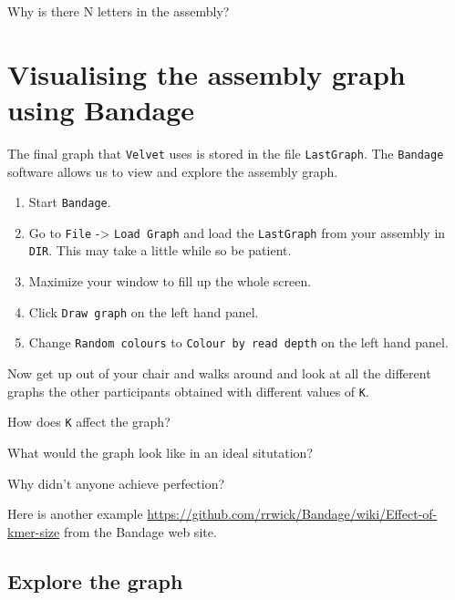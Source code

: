 \begin{questions}
Why is there N letters in the assembly?
\begin{answer}
\end{answer}
\end{questions}

\section{Visualising the assembly graph using Bandage}

The final graph that \texttt{Velvet} uses is stored in the file \texttt{LastGraph}. The \texttt{Bandage} software allows us to view and explore the assembly graph.
\begin{steps}
\begin{enumerate}
\item Start \texttt{Bandage}.
\item Go to \texttt{File} -> \texttt{Load Graph} and load the \texttt{LastGraph} from your assembly in \texttt{DIR}. This may take a little while so be patient.
\item Maximize your window to fill up the whole screen.
\item Click \texttt{Draw graph} on the left hand panel.
\item Change \texttt{Random colours} to \texttt{Colour by read depth} on the left hand panel.
\end{enumerate}
\end{steps}

Now get up out of your chair and walks around and look at all the different graphs the other participants obtained with different values of \texttt{K}.
\begin{questions}
How does \texttt{K} affect the graph?
\begin{answer}
\end{answer}
What would the graph look like in an ideal situtation?
\begin{answer}
\end{answer}
Why didn't anyone achieve perfection?
\begin{answer}
\end{answer}
\end{questions}

Here is another example \url{https://github.com/rrwick/Bandage/wiki/Effect-of-kmer-size} from the Bandage web site. %

\subsection{Explore the graph}

